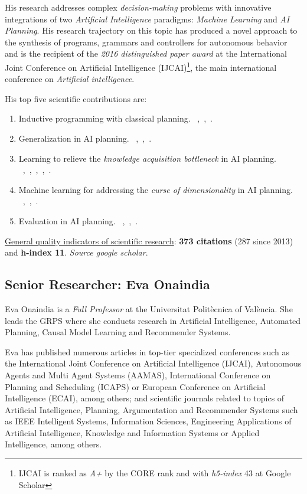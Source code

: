 \documentclass[10pt,a4paper]{paper}
\begin{document}
His research addresses complex {\em decision-making} problems with innovative integrations of two {\em Artificial Intelligence} paradigms: {\em Machine Learning} and {\em AI Planning}. His research trajectory on this topic has produced a novel approach to the synthesis of programs, grammars and controllers for autonomous behavior and is the recipient of the {\it 2016 distinguished paper award} at the International Joint Conference on Artificial Intelligence (IJCAI)\footnote{IJCAI is ranked as {\it A+} by the CORE rank and with {\it h5-index} 43 at Google Scholar}, the main international conference on {\em Artificial intelligence}.

His top five scientific contributions are:
\begin{enumerate}
\item Inductive programming with classical planning. {\footnotesize~\cite{javi-ijcai17},~\cite{segovia2016generalized},~\cite{jimenez2015computing}}.
\item Generalization in AI planning. {\footnotesize~\cite{javi-icaps17},~\cite{damir-derived-ijcai16},~\cite{javi-fsc-ijcai16}}.
\item Learning to relieve the {\it knowledge acquisition bottleneck} in AI planning. {\footnotesize{~\cite{diego-icaps18},~\cite{jimenez2013integrating},~\cite{jimenez2008architecture},~\cite{jimenez2006planning},~\cite{lanchas2007learning}}}.
\item Machine learning for addressing the {\it curse of dimensionality} in AI planning. {\footnotesize~\cite{jimenez2012review},~\cite{de2011scaling},~\cite{de2008learning}}.  
\item Evaluation in AI planning. {\footnotesize~\cite{lopez2015deterministic},~\cite{lopez2013automating},~\cite{coles2012survey}}. 
\end{enumerate}

\underline{General quality indicators of scientific research}: {\bf 373 citations} (287 since 2013) and {\bf h-index 11}. {\scriptsize\em Source google scholar}.


\subsection{Senior Researcher: Eva Onaindia}
Eva Onaindia is a {\em Full Professor} at the Universitat Politècnica of València. She leads the GRPS where she conducts research in Artificial Intelligence, Automated Planning, Causal Model Learning and Recommender Systems.

Eva has published numerous articles in top-tier specialized conferences such as the International Joint Conference on Artificial Intelligence (IJCAI), Autonomous Agents and Multi Agent Systems (AAMAS), International Conference on Planning and Scheduling (ICAPS) or European Conference on Artificial Intelligence (ECAI), among others; and scientific journals related to topics of Artificial Intelligence, Planning, Argumentation and Recommender Systems such as IEEE Intelligent Systems, Information Sciences, Engineering Applications of Artificial Intelligence, Knowledge and Information Systems or Applied Intelligence, among others.
\end{document}
